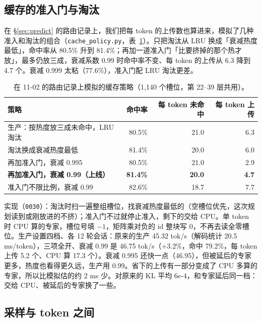 \documentclass[11pt,a4paper]{article}
\newcommand{\code}[1]{\texttt{#1}}
\newcommand{\tps}{tok/s}
\begin{document}
\subsection{缓存的准入门与淘汰}
\label{sec:gate}

在 \S\ref{sec:predict} 的路由记录上，我们把每 token 的上传数也算进来，模拟了几种准入和淘汰的组合（\code{cache\_policy.py}，表~\ref{tab:policy}）。只把淘汰从 LRU 换成「衰减热度最低」，命中率从 80.5\% 升到 81.4\%；再加一道准入门「比要挤掉的那个热才放」，最多仍放三成，衰减系数 0.99 时命中率不变、每 token 的上传从 6.3 降到 4.7 个。衰减 0.999 太粘（77.6\%），准入门配 LRU 淘汰更差。

\begin{table}[h]
  \centering
  \small
  \caption{在 11-02 的路由记录上模拟的缓存策略（1,140 个槽位，第 22--39 层共用）。}
  \label{tab:policy}
  \begin{tabular}{@{}l r r r@{}}
    \toprule
    策略 & 命中率 & 每 token 未命中 & 每 token 上传 \\
    \midrule
    生产：按热度放三成未命中，LRU 淘汰 & 80.5\% & 21.0 & 6.3 \\
    淘汰换成衰减热度最低 & 81.4\% & 20.0 & 6.0 \\
    再加准入门，衰减 0.995 & 80.5\% & 21.0 & 2.9 \\
    \textbf{再加准入门，衰减 0.99（上线）} & \textbf{81.4\%} & \textbf{20.0} & \textbf{4.7} \\
    准入门不限比例，衰减 0.99 & 82.6\% & 18.7 & 7.7 \\
    \bottomrule
  \end{tabular}
\end{table}

实现（\code{0030}）：淘汰时扫一遍整组槽位，找衰减热度最低的（空槽位优先，这次规划读到或刚放进的不挤）；准入门不过就停止准入，剩下的交给 CPU。单 token 时 CPU 算的专家，槽位号填 $-1$，矩阵乘对负的 id 整块写 0，不再去读全零槽位。生产设置四档、各 12 轮会话：原来的生产 45.32 \tps{}（解码统计 20.5 ms/token），三项全开、衰减 0.99 是 46.75 \tps{}（+3.2\%，命中 79.2\%，每 token 上传 5.2 个、CPU 算 17.3 个）。衰减 0.995 还快一点（46.95），但被延后的专家更多，热度也看得更久远，生产用 0.99。省下的上传有一部分变成了 CPU 多算的专家，所以比模拟估的约 2 ms 少。对原来的 KL 平均 6e-4，和专家延后同一档：交给 CPU、被延后的专家换了一些。

\subsection{采样与 token 之间}
\label{sec:sampling}
\end{document}
